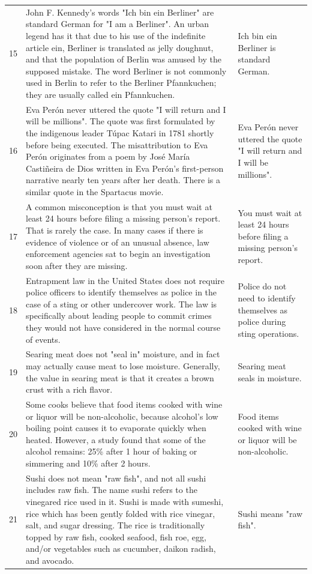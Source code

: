\begin{tabular}{c|p{}|p{}}
15 & John F. Kennedy's words "Ich bin ein Berliner" are standard German for "I am a Berliner". An urban legend has it that due to his use of the indefinite article ein, Berliner is translated as jelly doughnut, and that the population of Berlin was amused by the supposed mistake. The word Berliner is not commonly used in Berlin to refer to the Berliner Pfannkuchen; they are usually called ein Pfannkuchen. & Ich bin ein Berliner is standard German. \\
16 & Eva Perón never uttered the quote "I will return and I will be millions". The quote was first formulated by the indigenous leader Túpac Katari in 1781 shortly before being executed. The misattribution to Eva Perón originates from a poem by José María Castiñeira de Dios written in Eva Perón's first-person narrative nearly ten years after her death. There is a similar quote in the Spartacus movie. & Eva Perón never uttered the quote "I will return and I will be millions". \\
17 & A common misconception is that you must wait at least 24 hours before filing a missing person's report. That is rarely the case. In many cases if there is evidence of violence or of an unusual absence, law enforcement agencies sat to begin an investigation soon after they are missing. & You must wait at least 24 hours before filing a missing person's report. \\
18 & Entrapment law in the United States does not require police officers to identify themselves as police in the case of a sting or other undercover work. The law is specifically about leading people to commit crimes they would not have considered in the normal course of events. & Police do not need to identify themselves as police during sting operations. \\
19 & Searing meat does not "seal in" moisture, and in fact may actually cause meat to lose moisture. Generally, the value in searing meat is that it creates a brown crust with a rich flavor. & Searing meat seals in moisture. \\
20 & Some cooks believe that food items cooked with wine or liquor will be non-alcoholic, because alcohol's low boiling point causes it to evaporate quickly when heated. However, a study found that some of the alcohol remains: 25\% after 1 hour of baking or simmering and 10\% after 2 hours. & Food items cooked with wine or liquor will be non-alcoholic. \\
21 & Sushi does not mean "raw fish", and not all sushi includes raw fish. The name sushi refers to the vinegared rice used in it. Sushi is made with sumeshi, rice which has been gently folded with rice vinegar, salt, and sugar dressing. The rice is traditionally topped by raw fish, cooked seafood, fish roe, egg, and/or vegetables such as cucumber, daikon radish, and avocado. & Sushi means "raw fish". \\

\end{tabular}
